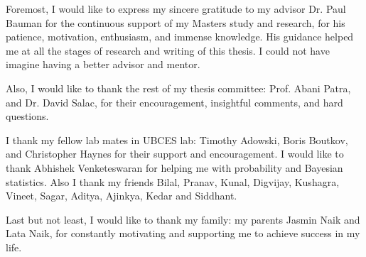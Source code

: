  Foremost, I would like to express my sincere gratitude to my advisor Dr. Paul Bauman for the continuous support of my Masters study and research, for his patience, motivation, enthusiasm, and immense knowledge. His guidance helped me at all the stages of research and writing of this thesis. I could not have imagine having a better advisor and mentor.

 Also, I would like to thank the rest of my thesis committee: Prof. Abani Patra,  and Dr. David Salac, for their encouragement, insightful comments, and hard questions.



 I thank my fellow lab mates in UBCES lab: Timothy Adowski, Boris Boutkov, and Christopher Haynes for their support and encouragement. I would like to thank Abhishek Venketeswaran for helping me with probability and Bayesian statistics. Also I thank my friends Bilal, Pranav, Kunal, Digvijay, Kushagra, Vineet, Sagar, Aditya, Ajinkya, Kedar and Siddhant.


 Last but not least, I would like to thank my family: my parents Jasmin Naik and Lata Naik, for constantly motivating and supporting me to achieve success in my life. 
